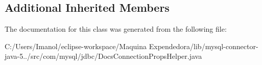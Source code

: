 \subsection*{Additional Inherited Members}


The documentation for this class was generated from the following file\+:\begin{DoxyCompactItemize}
\item 
C\+:/\+Users/\+Imanol/eclipse-\/workspace/\+Maquina Expendedora/lib/mysql-\/connector-\/java-\/5../src/com/mysql/jdbc/Docs\+Connection\+Props\+Helper.\+java\end{DoxyCompactItemize}

